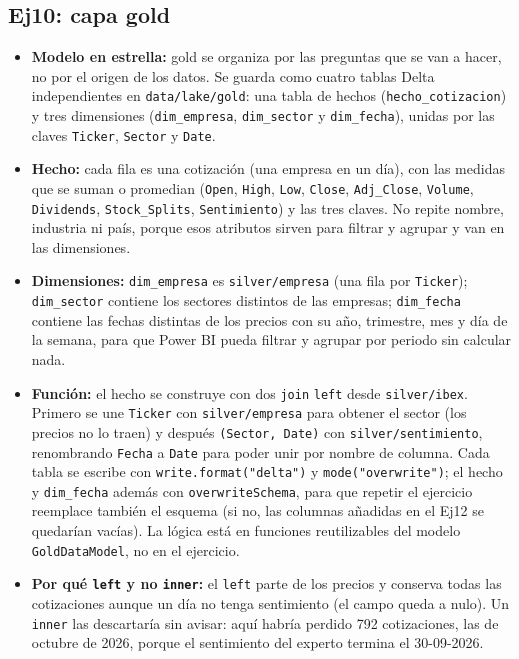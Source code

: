 \documentclass[11pt,a4paper]{article}
\newcommand{\code}[1]{\texttt{#1}}
\begin{document}
\subsection*{Ej10: capa gold}
\begin{itemize}
    \item \textbf{Modelo en estrella:} gold se organiza por las preguntas que se van a hacer, no por el origen de los datos. Se guarda como cuatro tablas Delta independientes en \code{data/lake/gold}: una tabla de hechos (\code{hecho\_cotizacion}) y tres dimensiones (\code{dim\_empresa}, \code{dim\_sector} y \code{dim\_fecha}), unidas por las claves \code{Ticker}, \code{Sector} y \code{Date}.
    \item \textbf{Hecho:} cada fila es una cotización (una empresa en un día), con las medidas que se suman o promedian (\code{Open}, \code{High}, \code{Low}, \code{Close}, \code{Adj\_Close}, \code{Volume}, \code{Dividends}, \code{Stock\_Splits}, \code{Sentimiento}) y las tres claves. No repite nombre, industria ni país, porque esos atributos sirven para filtrar y agrupar y van en las dimensiones.
    \item \textbf{Dimensiones:} \code{dim\_empresa} es \code{silver/empresa} (una fila por \code{Ticker}); \code{dim\_sector} contiene los sectores distintos de las empresas; \code{dim\_fecha} contiene las fechas distintas de los precios con su año, trimestre, mes y día de la semana, para que Power BI pueda filtrar y agrupar por periodo sin calcular nada.
    \item \textbf{Función:} el hecho se construye con dos \code{join} \code{left} desde \code{silver/ibex}. Primero se une \code{Ticker} con \code{silver/empresa} para obtener el sector (los precios no lo traen) y después \code{(Sector, Date)} con \code{silver/sentimiento}, renombrando \code{Fecha} a \code{Date} para poder unir por nombre de columna. Cada tabla se escribe con \code{write.format("delta")} y \code{mode("overwrite")}; el hecho y \code{dim\_fecha} además con \code{overwriteSchema}, para que repetir el ejercicio reemplace también el esquema (si no, las columnas añadidas en el Ej12 se quedarían vacías). La lógica está en funciones reutilizables del modelo \code{GoldDataModel}, no en el ejercicio.
    \item \textbf{Por qué \code{left} y no \code{inner}:} el \code{left} parte de los precios y conserva todas las cotizaciones aunque un día no tenga sentimiento (el campo queda a nulo). Un \code{inner} las descartaría sin avisar: aquí habría perdido 792 cotizaciones, las de octubre de 2026, porque el sentimiento del experto termina el 30-09-2026.

\end{itemize}
\end{document}
